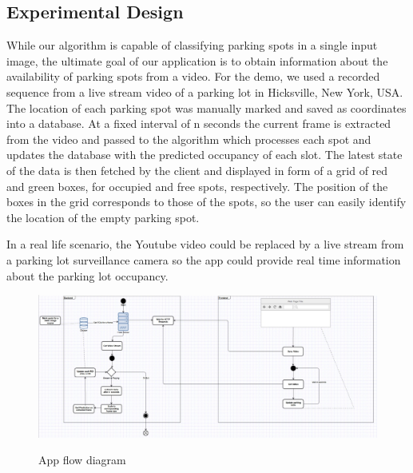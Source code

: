 \documentclass[12pt]{article}
\begin{document}
\subsection{Experimental Design}
While our algorithm is capable of classifying parking spots in a single input image, the ultimate goal of our application is to obtain information about the availability of parking spots from a video. 
For the demo, we used a recorded sequence from a live stream video of a parking lot in Hicksville, New York, USA. The location of each parking spot was manually marked and saved as coordinates into a database. 
At a fixed interval of n seconds the current frame is extracted from the video and passed to the algorithm which processes each spot and updates the database with the predicted occupancy of each slot.
The latest state of the data is then fetched by the client and displayed in form of a grid of red and green boxes, for occupied and free spots, respectively. 
The position of the boxes in the grid corresponds to those of the spots, so the user can easily identify the location of the empty parking spot.

In a real life scenario, the Youtube video could be replaced by a live stream from a parking lot surveillance camera so the app could provide real time information about the parking lot occupancy.

\begin{figure}
  \caption{App flow diagram}
  \includegraphics[width=1.0\textwidth]{flow}
  \label{fig:flowimg}
\end{figure}

\clearpage


\end{document}
